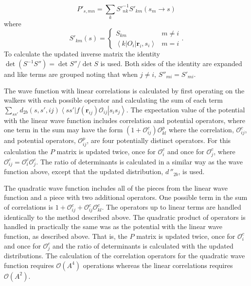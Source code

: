 \documentclass[aps,prc,twocolumn,superscriptaddress,showpacs,floatfix,nofootinbib]{revtex4-1}
\begin{document}
\begin{equation}
   P'_{s,mn}=\sum\limits_k S'^{-1}_{nk}S'_{km}(s_m\rightarrow s)
\end{equation}
where
\begin{equation}
   S'_{km}(s) = \left\{
   \begin{array}{cc}
      S_{km} & m \ne i\\
      \left<k\right|O_i\left|\mathbf{r}_i,s_i\right> & m = i
   \end{array}.
   \right.
\end{equation}
To calculate the updated inverse matrix the identity $\det(S^{-1}S'')=\det S''/\det S$ is used. Both sides of the identity are expanded and like terms are grouped noting that when $j \ne i$, $S''_{mi}=S'_{mi}$.

The wave function with linear correlations is calculated by first operating on the walkers with each possible operator and calculating the sum of each term $\sum\limits_{ss'}d_{2b}(s,s',ij)\left<ss'\right|f(\mathbf{r}_{ij})\mathcal{O}_{ij}\left|s_is_j\right>$. The expectation value of the potential with the linear wave function includes correlation and potential operators, where one term in the sum may have the form $\left(1+\mathcal{O}^c_{ij}\right)\mathcal{O}^p_{kl}$ where the correlation, $\mathcal{O}^c_{ij}$, and potential operators, $\mathcal{O}^p_{ij}$, are four potentially distinct operators. For this calculation the $P$ matrix is updated twice, once for $\mathcal{O}^c_i$ and once for $\mathcal{O}^c_j$, where $\mathcal{O}^c_{ij}=\mathcal{O}^c_i\mathcal{O}^c_j$. The ratio of determinants is calculated in a similar way as the wave function above, except that the updated distribution, $d\,''_{2b}$, is used.

The quadratic wave function includes all of the pieces from the linear wave function and a piece with two additional operators. One possible term in the sum of correlations is $1+\mathcal{O}^c_{ij}+\mathcal{O}^c_{ij}\mathcal{O}^c_{kl}$. The operators up to linear terms are handled identically to the method described above. The quadratic product of operators is handled in practically the same was as the potential with the linear wave function, as described above. That is, the $P$ matrix is updated twice, once for $\mathcal{O}^c_i$ and once for $\mathcal{O}^c_j$ and the ratio of determinants is calculated with the updated distributions. The calculation of the correlation operators for the quadratic wave function requires $\mathcal{O}(A^4)$ operations whereas the linear correlations requires $\mathcal{O}(A^2)$.
\end{document}
